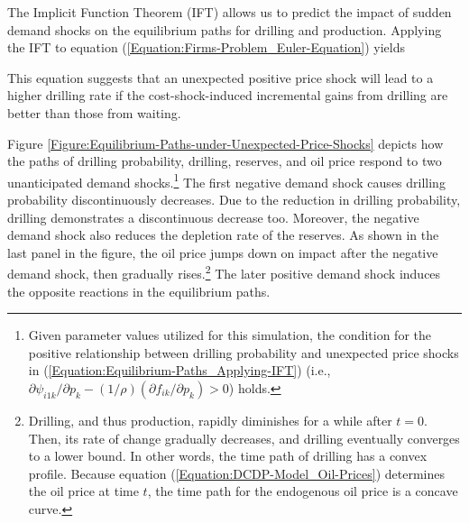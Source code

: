 The Implicit Function Theorem (IFT) allows us to predict the impact of sudden demand shocks on the equilibrium paths for drilling and production. Applying the IFT to equation (\ref{Equation:Firms-Problem_Euler-Equation}) yields

This equation suggests that an unexpected positive price shock will lead to a higher drilling rate if the cost-shock-induced incremental gains from drilling are better than those from waiting. 

Figure \ref{Figure:Equilibrium-Paths-under-Unexpected-Price-Shocks} depicts how the paths of drilling probability, drilling, reserves, and oil price respond to two unanticipated demand shocks.\footnote{Given parameter values utilized for this simulation, the condition for the positive relationship between drilling probability and unexpected price shocks in (\ref{Equation:Equilibrium-Paths_Applying-IFT}) (i.e., $\partial \psi_{i1k} / \partial p_{k} - (1/\rho)(\partial f_{ik} / \partial p_{k}) > 0$) holds.} The first negative demand shock causes drilling probability discontinuously decreases. Due to the reduction in drilling probability, drilling demonstrates a discontinuous decrease too. Moreover, the negative demand shock also reduces the depletion rate of the reserves. As shown in the last panel in the figure, the oil price jumps down on impact after the negative demand shock, then gradually rises.\footnote{Drilling, and thus production, rapidly diminishes for a while after $t = 0$. Then, its rate of change gradually decreases, and drilling eventually converges to a lower bound. In other words, the time path of drilling has a convex profile. Because equation (\ref{Equation:DCDP-Model_Oil-Prices}) determines the oil price at time $t$, the time path for the endogenous oil price is a concave curve.} The later positive demand shock induces the opposite reactions in the equilibrium paths. 

